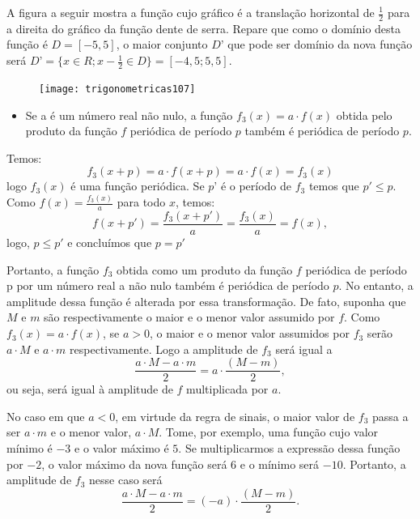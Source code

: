 A figura a seguir mostra a função cujo gráfico é a translação horizontal de $\frac{1}{2}$ para a direita do gráfico da função dente de serra. Repare que como o domínio desta função é $D = [-5,5]$, o maior conjunto $D’$ que pode ser domínio da nova função será $D’ =\{x\in R;x-\frac{1}{2}\in D\}= [-4{,}5; 5{,}5]$.

\begin{figure}[H]
\centering

\texttt{[image: trigonometricas107]}
\end{figure}

\begin{itemize}
\item 	Se a é um número real não nulo, a função $f_3(x) = a\cdot f(x)$ obtida pelo produto da função $f$ periódica de período $p$ também é periódica de período $p$.
\end{itemize}

Temos:
\begin{equation*}
f_3(x+p)=a\cdot f(x+p)=a\cdot f(x)=f_3(x)
\end{equation*}
logo $f_3(x)$ é uma função periódica. Se $p’$ é o período de $f_3$ temos que $p'\leq p$. Como $f(x) = \frac{f_3 (x)}{a}$ para todo $x$, temos:
\begin{equation*}
f(x+p')=\frac{f_3(x+p')}{a}=\frac{f_3(x)}{a}=f(x),
\end{equation*}
logo, $p\leq p'$ e concluímos que $p=p'$

Portanto, a função $f_3$ obtida como um produto da função $f$ periódica de período p por um número real a não nulo também é periódica de período $p$. No entanto, a amplitude dessa função é alterada por essa transformação. De fato, suponha que $M$ e $m$ são respectivamente o maior e o menor valor assumido por $f$. Como $f_3(x) = a\cdot f(x)$, se $a > 0$, o maior e o menor valor assumidos por $f_3$ serão $a\cdot M$ e  $a\cdot m$ respectivamente. Logo a amplitude de $f_3$ será igual a 
\begin{equation*}
\frac{a\cdot M-a\cdot m}{2}=a\cdot\frac{(M-m)}{2},
\end{equation*}
ou seja, será igual à amplitude de $f$ multiplicada por $a$.

No caso em que $a < 0$, em virtude da regra de sinais, o maior valor de $f_3$ passa a ser $a\cdot m$  e o menor valor, $a\cdot M$. Tome, por exemplo, uma função cujo valor mínimo é $-3$ e o valor máximo é $5$. Se multiplicarmos a expressão dessa função por $-2$, o valor máximo da nova função será $6$ e o mínimo será $-10$. Portanto, a amplitude de $f_3$ nesse caso será 
\begin{equation*}
\frac{a\cdot M-a\cdot m}{2}=(-a)\cdot\frac{(M-m)}{2}.
\end{equation*}

